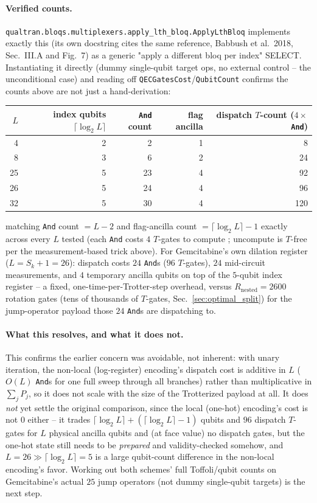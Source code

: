 \documentclass[11pt]{article}
\begin{document}
\paragraph{Verified counts.} \texttt{qualtran.bloqs.multiplexers.apply\_lth\_bloq.ApplyLthBloq} implements exactly this (its own docstring cites the same reference, Babbush et al.\ 2018, Sec.~III.A and Fig.~7) as a generic "apply a different bloq per index" SELECT. Instantiating it directly (dummy single-qubit target ops, no external control -- the unconditional case) and reading off \texttt{QECGatesCost}/\texttt{QubitCount} confirms the counts above are not just a hand-derivation:
\begin{center}
\begin{tabular}{@{}rrrrr@{}}
\toprule
$L$ & index qubits $\lceil\log_2L\rceil$ & \texttt{And} count & flag ancilla & dispatch $T$-count ($4\times$\texttt{And}) \\
\midrule
4  & 2 & 2  & 1 & 8   \\
8  & 3 & 6  & 2 & 24  \\
25 & 5 & 23 & 4 & 92  \\
26 & 5 & 24 & 4 & 96  \\
32 & 5 & 30 & 4 & 120 \\
\bottomrule
\end{tabular}
\end{center}
matching \texttt{And} count $=L-2$ and flag-ancilla count $=\lceil\log_2L\rceil-1$ exactly across every $L$ tested (each \texttt{And} costs $4$ $T$-gates to compute \cite{Babbush2018}; uncompute is $T$-free per the measurement-based trick above). For Gemcitabine's own dilation register ($L=S_k+1=26$): dispatch costs $24$ \texttt{And}s ($96$ $T$-gates), $24$ mid-circuit measurements, and $4$ temporary ancilla qubits on top of the $5$-qubit index register -- a fixed, one-time-per-Trotter-step overhead, versus $R_{\text{nested}}=2600$ rotation gates (tens of thousands of $T$-gates, Sec.~\ref{sec:optimal_split}) for the jump-operator payload those $24$ \texttt{And}s are dispatching to.

\paragraph{What this resolves, and what it does not.} This confirms the earlier concern was avoidable, not inherent: with unary iteration, the non-local (log-register) encoding's dispatch cost is additive in $L$ ($O(L)$ \texttt{And}s for one full sweep through all branches) rather than multiplicative in $\sum_jP_j$, so it does not scale with the size of the Trotterized payload at all. It does \emph{not} yet settle the original comparison, since the local (one-hot) encoding's cost is not $0$ either -- it trades $\lceil\log_2L\rceil+(\lceil\log_2L\rceil-1)$ qubits and $96$ dispatch $T$-gates for $L$ physical ancilla qubits and (at face value) no dispatch gates, but the one-hot state still needs to be \emph{prepared} and validity-checked somehow, and $L=26\gg\lceil\log_2L\rceil=5$ is a large qubit-count difference in the non-local encoding's favor. Working out both schemes' full Toffoli/qubit counts on Gemcitabine's actual $25$ jump operators (not dummy single-qubit targets) is the next step.
\end{document}

